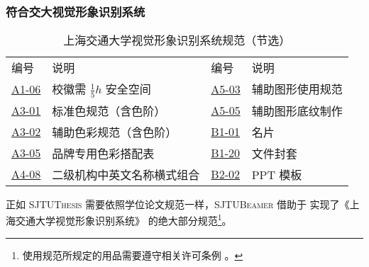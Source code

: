 \begin{frame}
  \frametitle{符合交大视觉形象识别系统}

  \begin{table}
    \caption{上海交通大学视觉形象识别系统规范（节选）}
    \vspace*{-5pt}
    \begin{stampbox}
      \footnotesize
      \begin{tabular}{llll}
        \alert{编号}                                                   & \alert{说明}                   & \alert{编号}                                                   & \alert{说明}     \\
        \href{https://vi.sjtu.edu.cn/index.php/articles/base/1}{A1-06} & 校徽需 $\frac{1}{5}h$ 安全空间 & \href{https://vi.sjtu.edu.cn/index.php/articles/base/5}{A5-03} & 辅助图形使用规范 \\
        \href{https://vi.sjtu.edu.cn/index.php/articles/base/3}{A3-01} & 标准色规范（含色阶）           & \href{https://vi.sjtu.edu.cn/index.php/articles/base/5}{A5-05} & 辅助图形底纹制作 \\
        \href{https://vi.sjtu.edu.cn/index.php/articles/base/3}{A3-02} & 辅助色彩规范（含色阶）         & \href{https://vi.sjtu.edu.cn/index.php/articles/app/7}{B1-01}  & 名片             \\
        \href{https://vi.sjtu.edu.cn/index.php/articles/base/3}{A3-05} & 品牌专用色彩搭配表             & \href{https://vi.sjtu.edu.cn/index.php/articles/app/7}{B1-20}  & 文件封套         \\
        \href{https://vi.sjtu.edu.cn/index.php/articles/base/4}{A4-08} & 二级机构中英文名称横式组合     & \href{https://vi.sjtu.edu.cn/index.php/articles/app/8}{B2-02}  & PPT 模板         \\
      \end{tabular}
    \end{stampbox}
  \end{table}

  正如 \textsc{SJTUThesis} 需要依照学位论文规范一样，\textsc{SJTUBeamer} 借助于 \TikZ{} 实现了《上海交通大学视觉形象识别系统》 的绝大部分规范\footnote{使用规范所规定的用品需要遵守相关许可条例 。}。


\end{frame}

